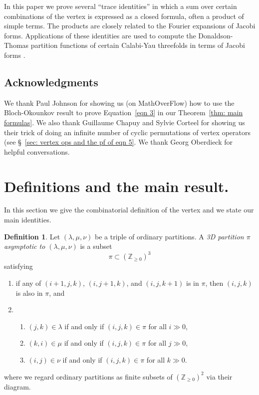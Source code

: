 \documentclass[12pt]{amsart}
\newcommand{\znums} {{\mathbb Z}}		%
\theoremstyle{definition}
\newtheorem{defn}[theorem]{Definition}
\begin{document}
In this paper we prove several ``trace identities'' in which a sum
over certain combinations of the vertex is expressed as a closed
formula, often a product of simple terms. The products are closely
related to the Fourier expansions of Jacobi forms. Applications of
these identities are used to compute the Donaldson-Thomas partition
functions of certain Calabi-Yau threefolds in terms of Jacobi forms
\cite{Bryan-K3xE,Bryan-Kool,BOPY}.

\subsection{Acknowledgments}\label{acknowledgments} We thank Paul
Johnson for showing us (on MathOverFlow) how to use the Bloch-Okounkov
result \cite{Bloch-Okounkov} to prove Equation~\eqref{eqn 3} in our
Theorem~\ref{thm: main formulas}. We also thank Guillaume Chapuy and
Sylvie Corteel for showing us their trick of doing an infinite number
of cyclic permutations of vertex operators (see \S~\ref{sec: vertex
ops and the pf of eqn 5}. We thank Georg Oberdieck for helpful
conversations.





\section{Definitions and the main result.}\label{sec: defns and
result}

In this section we give the combinatorial definition of the vertex and
we state our main identities.

\begin{defn}\label{defn: 3D partition asympt to (a,b,c)} Let $(\lambda
,\mu ,\nu )$ be a triple of ordinary partitions. A \emph{3D
partition $\pi $ asymptotic to $(\lambda ,\mu ,\nu )$} is a subset
\[
\pi \subset \left(\znums _{\geq 0} \right)^{3}
\]
satisfying
\begin{enumerate}
\item if any of $(i+1,j,k)$, $(i,j+1,k)$, and $(i,j,k+1)$ is in $\pi
$, then $(i,j,k)$ is also in $\pi $, and
\item
\begin{enumerate}
\item $(j,k)\in \lambda $ if and only if $(i,j,k)\in \pi $ for all $i\gg 0$,
\item $(k,i)\in \mu  $ if and only if $(i,j,k)\in \pi $ for all $j\gg 0$,
\item $(i,j)\in \nu  $ if and only if $(i,j,k)\in \pi $ for all $k\gg 0$.
\end{enumerate}
\end{enumerate}
where we regard ordinary partitions as finite subsets of $\left(\znums
_{\geq 0} \right)^{2}$ via their diagram.
\end{defn}
\end{document}

